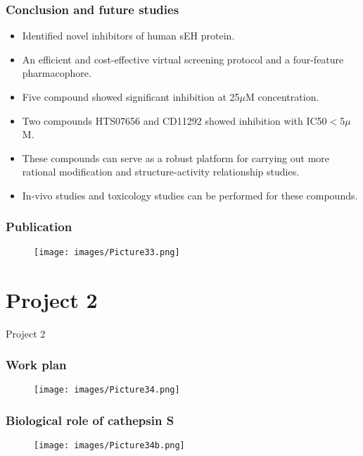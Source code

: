 \documentclass{beamer}
\begin{document}
\begin{frame}
\frametitle{\textbf{Conclusion and future studies}}
\begin{itemize}
\item Identified novel inhibitors of human sEH protein.
\item An efficient and cost-effective virtual screening protocol and a four-feature pharmacophore.
\item Five compound showed significant inhibition at 25$\mu$M concentration.
\item Two compounds HTS07656 and CD11292 showed inhibition with IC50$<$5$\mu$M.
\item These compounds can serve as a robust platform for carrying out more rational modification and structure-activity relationship studies.
\item In-vivo studies and toxicology studies can be performed for these compounds.
\end{itemize}
\end{frame}

\begin{frame}
\frametitle{\textbf{Publication}}
\begin{figure}
\texttt{[image: images/Picture33.png]}
\end{figure}
\end{frame}

\section{Project 2}

\begin{frame}
\begin{block}
\Huge{\centerline{Project 2}}
\end{block}
\end{frame}

\begin{frame}
\frametitle{\textbf{Work plan}}
\begin{figure}
\texttt{[image: images/Picture34.png]}
\end{figure}
\end{frame}

\begin{frame}
\frametitle{\textbf{Biological role of cathepsin S}}
\begin{figure}
\texttt{[image: images/Picture34b.png]}
\end{figure}
\end{frame}
\end{document}

